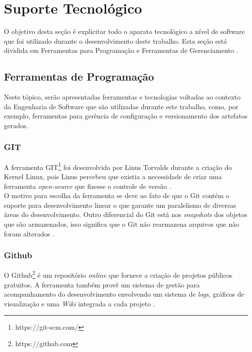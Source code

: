 
\chapter[Suporte Tecnológico]{Suporte Tecnológico}

O objetivo desta seção é explicitar todo o aparato tecnológico a nível de software que foi utilizado durante o desenvolvimento deste trabalho.  Esta seção está dividida em Ferramentas para Programação e Ferramentas de Gerenciamento .

\section{Ferramentas de Programação} %

\label{sec:engenharia_de_software}
	Neste tópico, serão apresentadas ferramentas e tecnologias voltadas ao contexto da Engenharia de Software que são utilizadas durante este trabalho, como, por exemplo, ferramentas para gerência de configuração e versionamento dos artefatos gerados.

	\subsection{GIT} %
	\label{sub:git}
	
		A ferramenta GIT\footnote{https://git-scm.com/} foi desenvolvida por Linus Torvalds durante a criação do Kernel Linux, pois Linus percebeu que existia a necessidade de criar uma ferramenta \textit{open-source} que fizesse o controle de versão \cite{bento_alise_2013}. 
		\\	O motivo para escolha da ferramenta se deve ao fato de que o Git contém o suporte para desenvolvimento linear o que garante um paralelismo de diversas áreas do desenvolvimento. Outro diferencial do Git está nos \textit{snapshots} dos objetos que são armazenados, isso significa que o Git não rearmazena arquivos que não foram alterados \cite{martinho_git_2013}.

	\subsection{Github} %
	\label{sub:github}
		O Github\footnote{https://github.com} é um repositório \textit{online} que fornece a criação de projetos públicos gratuitos. A ferramenta também provê um sistema de gestão para acompanhamento do desenvolvimento envolvendo um sistema de \textit{logs}, gráficos de visualização e uma \textit{Wiki} integrada a cada projeto \cite{martinho_git_2013}.
	
